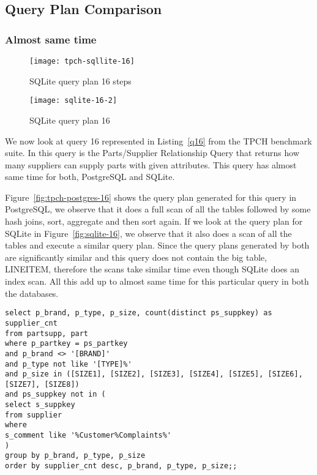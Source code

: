 \subsection{Query Plan Comparison}
\label{sec:plan}

\subsubsection{Almost same time}

\begin{figure*}[ht]
\centering
     \begin{subfigure}[b]{0.4\textwidth}
         \centering
         \texttt{[image: tpch-sqllite-16]}
         \caption{SQLite query plan 16 steps}
         \label{fig:tpch-sqllite-16}
     \end{subfigure}
     \hfill
     \begin{subfigure}[b]{0.4\textwidth}
         \centering
         \texttt{[image: sqlite-16-2]}
         \caption{SQLite query plan 16}
         \label{fig:sqlite-16-2}
     \end{subfigure}

        \caption{SQLite plan for query 16}
        \label{fig:sqlite-16}
\end{figure*}

We now look at query 16 represented in Listing~\ref{q16} from the TPCH benchmark suite. In this query is the Parts/Supplier Relationship Query that returns how many suppliers can supply parts with given attributes. This query has almost same time for both, PostgreSQL and SQLite.

Figure~\ref{fig:tpch-postgres-16} shows the query plan generated for this query in PostgreSQL, we observe that it does a full scan of all the tables followed by some hash joins, sort, aggregate and then sort again. If we look at the query plan for SQLite in Figure~\ref{fig:sqlite-16}, we observe that it also does a scan of all the tables and execute a similar query plan. Since the query plans generated by both are significantly similar and this query does not contain the big table, LINEITEM, therefore the scans take similar time even though SQLite does an index scan. All this add up to almost same time for this particular query in both the databases.\\

\begin{minipage}{\linewidth}
\begin{lstlisting}[breaklines=true, numbers=none, label=q16, caption=Query 16]
select p_brand, p_type, p_size, count(distinct ps_suppkey) as supplier_cnt
from partsupp, part
where p_partkey = ps_partkey
and p_brand <> '[BRAND]'
and p_type not like '[TYPE]%'
and p_size in ([SIZE1], [SIZE2], [SIZE3], [SIZE4], [SIZE5], [SIZE6], [SIZE7], [SIZE8])
and ps_suppkey not in (
select s_suppkey
from supplier
where
s_comment like '%Customer%Complaints%'
)
group by p_brand, p_type, p_size
order by supplier_cnt desc, p_brand, p_type, p_size;;
\end{lstlisting}
\end{minipage}



